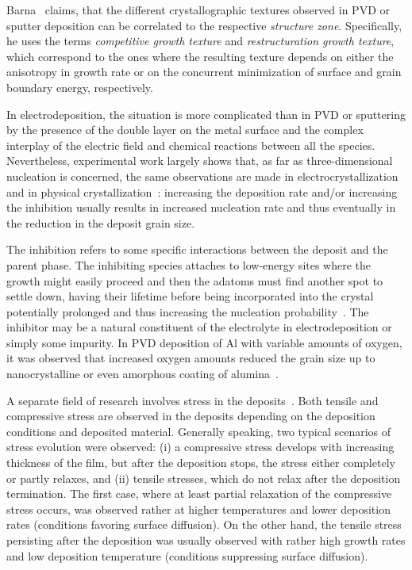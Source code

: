 Barna~\cite{Barna1998} claims, that the different crystallographic textures observed in PVD or sputter deposition can be correlated to the respective \textit{structure zone}. Specifically, he uses the terms \textit{competitive growth texture} and \textit{restructuration growth texture}, which correspond to the ones where the resulting texture depends on either the anisotropy in growth rate or on the concurrent minimization of surface and grain boundary energy, respectively.

In electrodeposition, the situation is more complicated than in PVD or sputtering by the presence of the double layer on the metal surface and the complex interplay of the electric field and chemical reactions between all the species.  Nevertheless, experimental work largely shows that, as far as three-dimensional nucleation is concerned, the same observations are made in electrocrystallization
and in physical crystallization~\cite{Winand1992}: increasing the deposition rate and/or increasing the inhibition usually results in increased nucleation rate and thus eventually in the reduction in the deposit grain size.

The inhibition refers to some specific interactions between the deposit and the parent phase. The inhibiting species attaches to low-energy sites where the growth might easily proceed and then the adatoms must find another spot to settle down, having their lifetime before being incorporated into the crystal potentially prolonged and thus increasing the nucleation probability~\cite{Winand1992}. The inhibitor may be a natural constituent of the electrolyte in electrodeposition or simply some impurity. In PVD deposition of Al with variable amounts of oxygen, it was observed that increased oxygen amounts reduced the grain size up to nanocrystalline or even amorphous coating of alumina~\cite{Barna1998}.

A separate field of research involves stress in the deposits~\cite{Thornton1989, Thompson1993, Chason2015, Abadias2018}. Both tensile and compressive stress are observed in the deposits depending on the deposition conditions and deposited material. Generally speaking, two typical scenarios of stress evolution were observed: (i) a compressive stress develops with increasing thickness of the film, but after the deposition stops, the stress either completely or partly relaxes, and (ii) tensile stresses, which do not relax after the deposition termination. The first case, where at least partial relaxation of the compressive stress occurs, was observed rather at higher temperatures and lower deposition rates (conditions favoring surface diffusion). On the other hand, the tensile stress persisting after the deposition was usually observed with rather high growth rates and low deposition temperature (conditions suppressing surface diffusion). 

